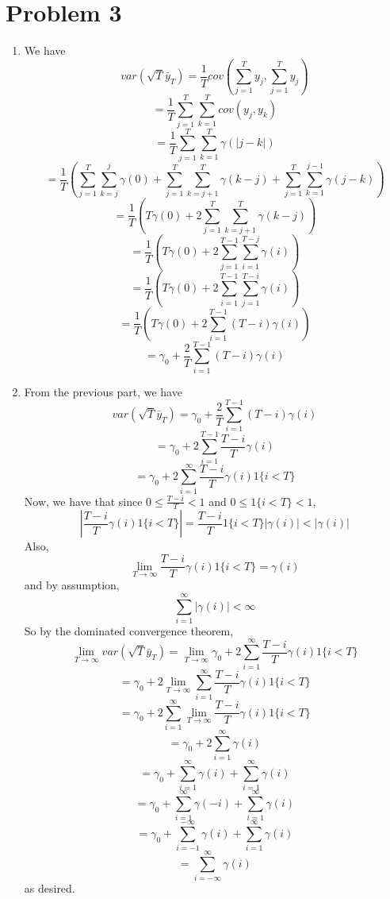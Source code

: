 \documentclass[10pt,letter]{article}
\begin{document}
\section*{Problem 3}
\begin{enumerate}[label=(\alph*)]
\item We have
\[ var(\sqrt{T} \bar{y}_T) = \frac{1}{T}cov\left(\sum_{j=1}^T y_j, \sum_{j=1}^T y_j\right) \]
\[ = \frac{1}{T}\sum_{j=1}^T\sum_{k=1}^T cov(y_j,y_k) \]
\[ = \frac{1}{T}\sum_{j=1}^T\sum_{k=1}^T \gamma(|j-k|) \]
\[ = \frac{1}{T}\left(\sum_{j=1}^T \sum_{k=j}^j \gamma(0) + \sum_{j=1}^T\sum_{k=j+1}^T \gamma(k-j) + \sum_{j=1}^T\sum_{k=1}^{j-1} \gamma(j-k) \right)\]
\[ = \frac{1}{T}\left(T \gamma(0) + 2\sum_{j=1}^T\sum_{k=j+1}^T \gamma(k-j) \right)\]
\[ = \frac{1}{T}\left(T \gamma(0) + 2\sum_{j=1}^{T-1}\sum_{i=1}^{T-j} \gamma(i) \right)\]
\[ = \frac{1}{T}\left(T \gamma(0) + 2\sum_{i=1}^{T-1}\sum_{j=1}^{T-i} \gamma(i) \right)\]
\[ = \frac{1}{T}\left(T \gamma(0) + 2\sum_{i=1}^{T-1} (T-i) \gamma(i) \right)\]
\[ = \gamma_0 + \frac{2}{T} \sum_{i=1}^{T-1} (T-i) \gamma(i) \]
\item From the previous part, we have
\[ var(\sqrt{T} \bar{y}_T) = \gamma_0 + \frac{2}{T} \sum_{i=1}^{T-1} (T-i) \gamma(i) \]
\[ = \gamma_0 + 2\sum_{i=1}^{T-1} \frac{T-i}{T} \gamma(i) \]
\[  = \gamma_0 + 2\sum_{i=1}^{\infty} \frac{T-i}{T} \gamma(i) 1\{i<T\} \]
Now, we have that since $0 \le \frac{T-i}{T} < 1$ and $0 \le 1\{i < T\} < 1$,
\[ \left| \frac{T-i}{T} \gamma(i) 1\{i<T\} \right| =   \frac{T-i}{T}1\{i<T\}|\gamma(i)|< |\gamma(i)| \]
Also,
\[ \lim_{T \to \infty} \frac{T-i}{T} \gamma(i) 1\{i<T\} = \gamma(i) \]
and by assumption,
\[ \sum_{i=1}^\infty |\gamma(i)| < \infty \]
So by the dominated convergence theorem,
\[ \lim_{T\to\infty} var(\sqrt{T} \bar{y}_T) = \lim_{T\to\infty} \gamma_0 + 2\sum_{i=1}^{\infty} \frac{T-i}{T} \gamma(i) 1\{i<T\}   \]
\[ = \gamma_0 + 2 \lim_{T \to \infty} \sum_{i=1}^{\infty} \frac{T-i}{T} \gamma(i) 1\{i<T\}  \]
\[ = \gamma_0 + 2 \sum_{i=1}^{\infty} \lim_{T \to \infty}  \frac{T-i}{T} \gamma(i) 1\{i<T\}  \]
\[ = \gamma_0 + 2 \sum_{i=1}^{\infty} \gamma(i) \]
\[ = \gamma_0 + \sum_{i=1}^{\infty} \gamma(i) + \sum_{i=1}^{\infty} \gamma(i) \]
\[ = \gamma_0 + \sum_{i=1}^{\infty} \gamma(-i) + \sum_{i=1}^{\infty} \gamma(i) \]
\[ = \gamma_0 + \sum_{i=-1}^{-\infty} \gamma(i) + \sum_{i=1}^{\infty} \gamma(i) \]
\[ = \sum_{i=-\infty}^{\infty} \gamma(i)  \]
as desired.
\end{enumerate}
\end{document}
